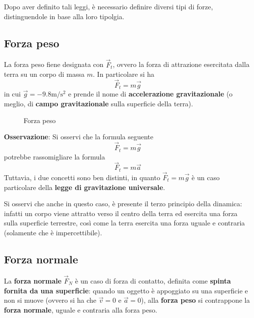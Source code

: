 \documentclass[a4paper]{extarticle}
\begin{document}
\vspace{1em}
\noindent
Dopo aver definito tali leggi, è necessario definire diversi tipi di forze, distinguendole in base alla loro tipolgia.

\vspace{1em}
\noindent
\subsection{Forza peso}
La forza peso fiene designata con $\vec{F}_t$, ovvero la forza di attrazione esercitata dalla terra su un corpo di massa $m$. In particolare si ha
\[\boxed{\vec{F}_t = m \vec{g}}\]
in cui $\vec{g} = -9.8 \text{m}/\text{s}^2$ e prende il nome di \textbf{accelerazione gravitazionale} (o meglio, di \textbf{campo gravitazionale} sulla superficie della terra).

\vspace{1em}
\begin{figure}[H]
  \centering
  \caption{Forza peso}
  \label{fig:forza_peso}
\end{figure}

\vspace{1em}
\noindent
\textbf{Osservazione}: Si osservi che la formula seguente
\[\vec{F}_t = m \vec{g}\]
potrebbe rassomigliare la formula
\[\vec{F}_t = m \vec{a}\]
Tuttavia, i due concetti sono ben distinti, in quanto $\vec{F}_t = m \vec{g}$ è un caso particolare della \textbf{legge di gravitazione universale}.

\vspace{1em}
\noindent
Si osservi che anche in questo caso, è presente il terzo principio della dinamica: infatti un corpo viene attratto verso il centro della terra ed esercita una forza sulla superficie terrestre, così come la terra esercita una forza uguale e contraria (solamente che è impercettibile).

\vspace{1em}
\subsection{Forza normale}
La \textbf{forza normale} $\vec{F}_N$ è un caso di forza di contatto, definita come \textbf{spinta fornita da una superficie}: quando un oggetto è appoggiato su una superficie e non si muove (ovvero si ha che $\vec{v}=0$ e $\vec{a}=0$), alla \textbf{forza peso} si contrappone la \textbf{forza normale}, uguale e contraria alla forza peso.
\end{document}
